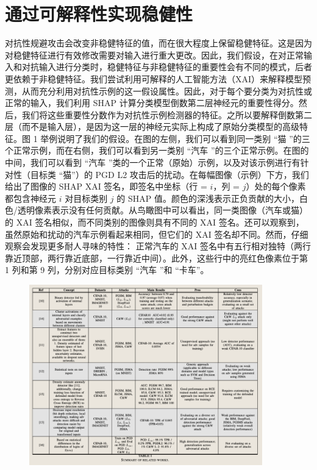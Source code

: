\documentclass[12pt, a4paper]{ctexart} %
\begin{document}
\section{通过可解释性实现稳健性}
对抗性规避攻击会改变非稳健特征的值，而在很大程度上保留稳健特征。这是因为对稳健特征进行有效修改需要对输入进行重大更改。因此，我们假设，在对正常输入和对抗输入进行分类时，稳健特征与非稳健特征的重要性会有不同的模式，后者更依赖于非稳健特征。我们尝试利用可解释的人工智能方法（XAI）来解释模型预测，从而充分利用对抗性示例的这一假设属性。因此，对于每个要分类为对抗性或正常的输入，我们利用 SHAP  计算分类模型倒数第二层神经元的重要性得分。然后，我们将这些重要性分数作为对抗性示例检测器的特征。之所以要解释倒数第二层（而不是输入层），是因为这一层的神经元实际上构成了原始分类模型的高级特征。图 1 举例说明了我们的假设。在图的左侧，我们可以看到同一类别 “猫 ”的三个正常示例，而在右侧，我们可以看到另一类别 “汽车 ”的三个正常示例。在图的中间，我们可以看到 “汽车 ”类的一个正常（原始）示例，以及对该示例进行有针对性（目标类 “猫”）的 PGD L2 攻击后的扰动。在每幅图像（示例）下方，我们给出了图像的 SHAP XAI 签名，即签名中坐标（行 = $i$，列 = $j$）处的每个像素都包含神经元 $i$ 对目标类别 $j$ 的 SHAP 值。颜色的深浅表示正负贡献的大小，白色/透明像素表示没有任何贡献。从鸟瞰图中可以看出，同一类图像（汽车或猫）的 XAI 签名相似，而不同类别的图像则具有不同的 XAI 签名。还可以观察到，虽然原始和扰动的汽车示例看起来相同，但它们的 XAI 签名却不同。然而，仔细观察会发现更多耐人寻味的特性： 正常汽车的 XAI 签名中有五行相对独特（两行靠近顶部，两行靠近底部，一行靠近中间）。此外，这些行中的亮红色像素位于第 1 列和第 9 列，分别对应目标类别 “汽车 ”和 “卡车”。
\begin{figure}[h]
    \centering
    \includegraphics[width=0.9\textwidth]{img/adversaries_1.png}
\end{figure}
\end{document}
